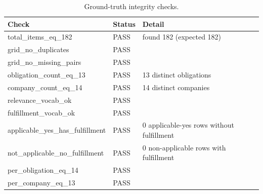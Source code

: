 \begin{table}[htbp]
  \centering
  \caption{Ground-truth integrity checks.}
  \label{tab:gt-sanity}
  \begin{tabular}{lll}
    \toprule
    Check & Status & Detail \\
    \midrule
    total\_items\_eq\_182 & PASS & found 182 (expected 182) \\
    grid\_no\_duplicates & PASS &  \\
    grid\_no\_missing\_pairs & PASS &  \\
    obligation\_count\_eq\_13 & PASS & 13 distinct obligations \\
    company\_count\_eq\_14 & PASS & 14 distinct companies \\
    relevance\_vocab\_ok & PASS &  \\
    fulfillment\_vocab\_ok & PASS &  \\
    applicable\_yes\_has\_fulfillment & PASS & 0 applicable-yes rows without fulfillment \\
    not\_applicable\_no\_fulfillment & PASS & 0 non-applicable rows with fulfillment \\
    per\_obligation\_eq\_14 & PASS &  \\
    per\_company\_eq\_13 & PASS &  \\
    \bottomrule
  \end{tabular}
\end{table}
